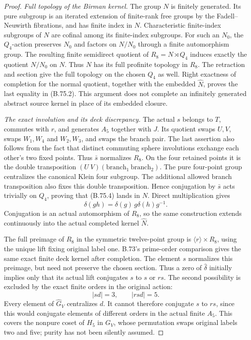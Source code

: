 \begin{proof}
\emph{Full topology of the Birman kernel.}
The group \(N\) is finitely generated.  Its pure subgroup
is an iterated extension of finite-rank free groups by the
Fadell--Neuwirth fibrations, and has finite index in \(N\).
Characteristic finite-index subgroups of \(N\) are cofinal
among its finite-index subgroups.  For such an \(N_0\), the
\(Q_4\)-action preserves \(N_0\) and factors on \(N/N_0\)
through a finite automorphism group.  The resulting finite
semidirect quotient of \(R_8=N\rtimes Q_4\) induces exactly
the quotient \(N/N_0\) on \(N\).
Thus \(N\) has its full profinite topology in \(R_8\).
The retraction and section give the full topology on the
chosen \(Q_4\) as well.  Right exactness of completion for
the normal quotient, together with the embedded \(\widehat N\),
proves the last equality in (B.75.2).
This argument does not complete an infinitely generated
abstract source kernel in place of its embedded closure.

\emph{The exact involution and its deck discrepancy.}
The actual \(s\) belongs to \(T\), commutes with \(r\), and
generates \(A_5\) together with \(J\).
Its quotient swaps \(U,V\), swaps \(W_1,W_4\) and
\(W_2,W_3\), and swaps the branch pair.  The last assertion
also follows from the fact that distinct commuting sphere
involutions exchange each other's two fixed points.
Thus \(\bar s\) normalizes \(R_8\).
On the four retained points it is the double transposition
\((U\ V)(\text{branch}_1\ \text{branch}_2)\).
The pure four-point group centralizes the canonical Klein
four subgroup.  The additional allowed branch transposition
also fixes this double transposition.  Hence conjugation
by \(\bar s\) acts trivially on \(Q_4\), proving that
(B.75.4) lands in \(N\).  Direct multiplication gives
\[
       \delta(gh)=\delta(g)\,g\delta(h)g^{-1}.
                                                               \tag{B.75.10}
\]
Conjugation is an actual automorphism of \(R_8\), so the
same construction extends continuously into the actual
completed kernel \(\widehat N\).

The full preimage of \(R_8\) in the symmetric twelve-point
group is \(\langle r\rangle\times R_8\), using the unique
lift fixing original label one.  B.73's prime-order
comparison gives the same exact finite deck kernel after
completion.  The element \(s\) normalizes this preimage,
but need not preserve the chosen section.  Thus a zero
of \(\widehat\delta\) initially implies only that its
actual lift conjugates \(s\) to \(s\) or \(rs\).
The second possibility is excluded by the exact finite
orders in the original action:
\[
                      |sd|=3,\qquad |rsd|=5.
                                                               \tag{B.75.11}
\]
Every element of \(\widehat G_V\) centralizes \(d\).
It cannot therefore conjugate \(s\) to \(rs\), since this
would conjugate elements of different orders in the actual
finite \(A_5\).  This covers the nonpure coset of
\(H_5\) in \(G_V\), whose permutation swaps original
labels two and five; purity has not been silently assumed.


\end{proof}
